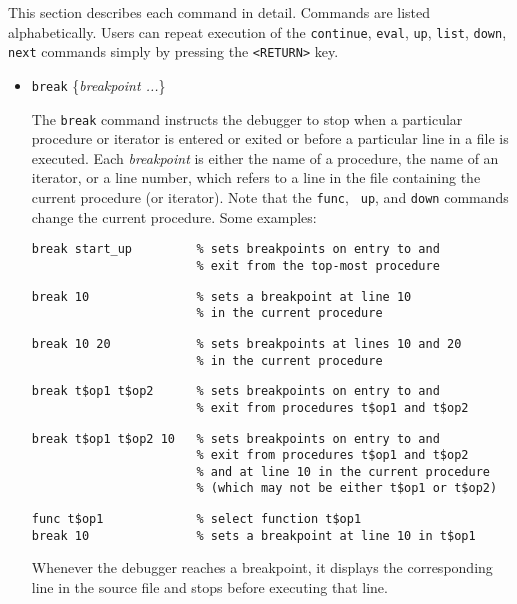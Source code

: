 This section describes each command in detail.  Commands are listed
alphabetically.  Users can repeat execution of the {\tt continue}, {\tt eval},
{\tt up}, {\tt list}, {\tt down}, {\tt next} commands simply by pressing the
{\tt <RETURN>} key.



\begin{itemize}

\item {\tt break} \{{\it breakpoint ...}\}

The {\tt break} command instructs the debugger to stop when a particular
procedure or iterator is entered or exited or before a particular line in a
file is executed.  Each {\it breakpoint} is either the name of a procedure, the
name of an iterator, or a line number, which refers to a line in the file
containing the current procedure (or iterator).  Note that the {\tt func}, {\tt
up}, and {\tt down} commands change the current procedure.  Some examples:
\begin{verbatim}
break start_up         % sets breakpoints on entry to and
                       % exit from the top-most procedure
\end{verbatim}
\begin{verbatim}
break 10               % sets a breakpoint at line 10
                       % in the current procedure
\end{verbatim}
\begin{verbatim}
break 10 20            % sets breakpoints at lines 10 and 20
                       % in the current procedure
\end{verbatim}
\begin{verbatim}
break t$op1 t$op2      % sets breakpoints on entry to and
                       % exit from procedures t$op1 and t$op2
\end{verbatim}
\begin{verbatim}
break t$op1 t$op2 10   % sets breakpoints on entry to and
                       % exit from procedures t$op1 and t$op2       
                       % and at line 10 in the current procedure
                       % (which may not be either t$op1 or t$op2)
\end{verbatim}
\begin{verbatim}
func t$op1             % select function t$op1
break 10               % sets a breakpoint at line 10 in t$op1
\end{verbatim}
Whenever the debugger reaches a breakpoint, it displays the corresponding line
in the source file and stops before executing that line.


\end{itemize}

